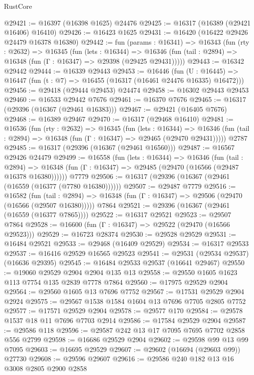 \begin{lexlean}{RustCore}
\begin{coremodule}
@29421 := @16397 (@16398 @1625) @24476
@29425 := @16317 (@16389 (@29421 @16406) @16410)
@29426 := @16423 @1625
@29431 := @16420 (@16422 @29426 @24479 @16378 @16380)
@29442 := fun (params : @16341) =>
  @16343
    (fun (rty : @2632) =>
    @16345
      (fun (lets : @16344) =>
      @16346 (fun (tail : @2894) => @16348 (fun (Γ : @16347) => @29398 (@29425 @29431)))))
@29443 := @16342 @29442
@29444 := @16339 @29443
@29453 := @16446
    (fun (U : @16445) => @16447 (fun (t : @7) => @16455 (@16317 (@16461 @24476 @16335) @16472)))
@29456 := @29418 (@29444 @29453) @24474
@29458 := @16302 @29443 @29453
@29460 := @16533 @29442 @7676
@29461 := @16370 @7676
@29465 := @16317 (@29396 (@16367 (@29461 @16383)))
@29467 := @29421 (@16405 @7676)
@29468 := @16389 @29467
@29470 := @16317 (@29468 @16410)
@29481 := @16536
    (fun (rty : @2632) =>
    @16345
      (fun (lets : @16344) =>
      @16346 (fun (tail : @2894) => @16348 (fun (Γ : @16347) => @29465 (@29470 @29431)))))
    @2787
@29485 := @16317 (@29396 (@16367 (@29461 @16560)))
@29487 := @16567 @29426 @24479
@29499 := @16558
    (fun (lets : @16344) =>
    @16346
      (fun (tail : @2894) =>
      @16348 (fun (Γ : @16347) => @29485 (@29470 (@16566 (@29487 @16378 @16380))))))
    @7779
@29506 := @16317 (@29396 (@16367 (@29461 (@16559 (@16377 (@7780 @16380))))))
@29507 := @29487 @7779
@29516 := @16582
    (fun (tail : @2894) => @16348 (fun (Γ : @16347) => @29506 (@29470 (@16566 (@29507 @16380)))))
    @7864
@29521 := @29396 (@16367 (@29461 (@16559 (@16377 @7865))))
@29522 := @16317 @29521
@29523 := @29507 @7864
@29528 := @16600 (fun (Γ : @16347) => @29522 (@29470 (@16566 @29523)))
@29529 := @16723 @28374
@29530 := @29528 @29529
@29531 := @16484 @29521
@29533 := @29468 (@16409 @29529)
@29534 := @16317 @29533
@29537 := @16416 @29529 @16565 @29523
@29541 := @29531 (@29534 @29537) (@16636 @29395)
@29545 := @16484 @29533 @29537 (@16641 @29467)
@29550 := @19060 @29529 @2904 @2904 @135 @13
@29558 := @29550 @1605 @1623 @113 @7754 @135 @2839 @7778 @7864
@29560 := @17975 @29529 @2904
@29564 := @29560 @1605 @13 @7696 @7752
@29567 := @17531 @29529 @2904 @2924
@29575 := @29567 @1538 @1584 @1604 @13 @7696 @7705 @2805 @7752
@29577 := @17571 @29529 @2904
@29578 := @29577 @170
@29584 := @29578 @1537 @18 @11 @7696 @7703 @2914
@29586 := @17584 @29529 @2904
@29587 := @29586 @118
@29596 := @29587 @242 @13 @17 @7095 @7695 @7702 @2858 @556 @2799
@29598 := @16686 @29529 @2904
@29602 := @29598 @99 @13 @99 @7095
@29603 := @16695 @29529
@29607 := @29602 (@16694 (@29603 @99)) @27730
@29608 := @29596 @29607
@29616 := @29586 @240 @182 @13 @16 @3008 @2805 @2900 @2858

\end{coremodule}
\end{lexlean}
